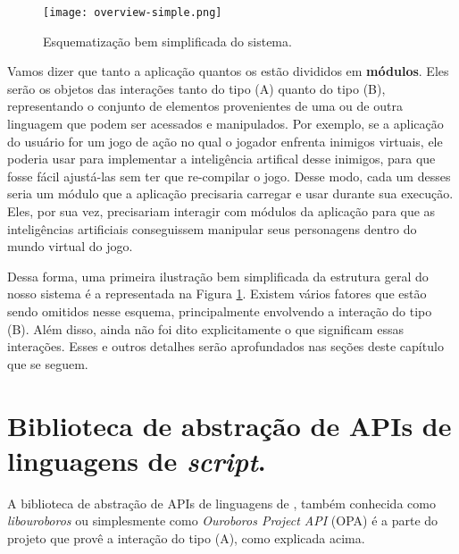     \begin{figure}[ht]
      \centering
      \texttt{[image: overview-simple.png]}
      \caption{Esquematização bem simplificada do sistema.}
      \label{fig:overview-simple}
    \end{figure}

    Vamos dizer que tanto a aplicação quantos os  estão divididos
    em \textbf{módulos}. Eles serão os objetos das interações tanto do tipo (A)
    quanto do tipo (B), representando o conjunto de elementos provenientes de
    uma ou de outra linguagem que podem ser acessados e manipulados. Por
    exemplo, se a aplicação do usuário for um jogo de ação no qual o jogador
    enfrenta inimigos virtuais, ele poderia usar  para implementar a
    inteligência artifical desse inimigos, para que fosse fácil ajustá-las sem
    ter que re-compilar o jogo. Desse modo, cada um desses  seria um
    módulo que a aplicação precisaria carregar e usar durante sua execução.
    Eles, por sua vez, precisariam interagir com módulos da aplicação para que
    as inteligências artificiais conseguissem manipular seus personagens dentro
    do mundo virtual do jogo.

    Dessa forma, uma primeira ilustração bem simplificada da estrutura geral do
    nosso sistema é a representada na Figura \ref{fig:overview-simple}. Existem
    vários fatores que estão sendo omitidos nesse esquema, principalmente
    envolvendo a interação do tipo (B). Além disso, ainda não foi dito
    explicitamente o que significam essas interações. Esses e outros detalhes
    serão aprofundados nas seções deste capítulo que se seguem.

  \section{Biblioteca de abstração de APIs de linguagens de \emph{script}.}
  \label{sec:estrutura:opa}
  A biblioteca de abstração de APIs de linguagens de \script{}, também conhecida como
  \textit{libouroboros} ou simplesmente como \emph{Ouroboros Project API} (OPA) é
  a parte do projeto que provê a interação do tipo (A), como explicada acima.
  
